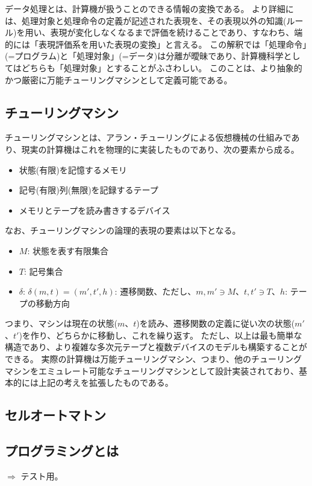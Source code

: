 データ処理とは、計算機が扱うことのできる情報の変換である。
より詳細には、処理対象と処理命令の定義が記述された表現を、その表現以外の知識(ルール)を用い、表現が変化しなくなるまで評価を続けることであり、すなわち、端的には「表現評価系を用いた表現の変換」と言える。
この解釈では「処理命令」(=プログラム)と「処理対象」(=データ)は分離が曖昧であり、計算機科学としてはどちらも「処理対象」とすることがふさわしい。
このことは、より抽象的かつ厳密に万能チューリングマシンとして定義可能である。
\subsection{チューリングマシン}
チューリングマシンとは、アラン・チューリングによる仮想機械の仕組みであり、現実の計算機はこれを物理的に実装したものであり、次の要素から成る。
\begin{itemize}
\item 状態(有限)を記憶するメモリ
\item 記号(有限)列(無限)を記録するテープ
\item メモリとテープを読み書きするデバイス
\end{itemize}
なお、チューリングマシンの論理的表現の要素は以下となる。
\begin{itemize}
\item $M$: 状態を表す有限集合
\item $T$: 記号集合
\item $\delta$: $\delta(m,t) = (m', t', h)$: 遷移関数、ただし、$m,m' \ni M$、$t,t' \ni T$、$h$: テープの移動方向
\end{itemize}
つまり、マシンは現在の状態($m$、$t$)を読み、遷移関数の定義に従い次の状態($m'$、$t'$)を作り、どちらかに移動し、これを繰り返す。
ただし、以上は最も簡単な構造であり、より複雑な多次元テープと複数デバイスのモデルも構築することができる。
実際の計算機は万能チューリングマシン、つまり、他のチューリングマシンをエミュレート可能なチューリングマシンとして設計実装されており、基本的には上記の考えを拡張したものである。

\subsection{セルオートマトン}
\subsection{プログラミングとは}

\begin{breakbox}$\Rightarrow$
テスト用。
\end{breakbox}
